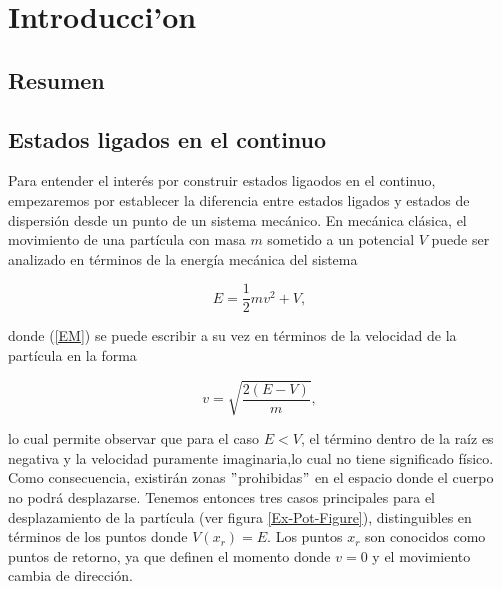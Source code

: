 
\chapter{Introducci'on}

\section{Resumen}

\section{Estados ligados en el continuo}

Para entender el interés por construir estados ligaodos en el continuo, empezaremos por establecer la diferencia entre estados ligados y estados de dispersión desde un punto de un sistema mecánico. En mecánica clásica, el movimiento de una partícula con masa $m$ sometido a un potencial $V$ puede ser analizado en términos de la energía mecánica del sistema

\begin{equation}
	E = \frac{1}{2} mv^2 + V, \label{EM}
\end{equation}

donde (\ref{EM})  se puede escribir a su vez en términos de la velocidad de la partícula en la forma

\begin{equation*}
v = \sqrt{\frac{2(E-V)}{m}},
\end{equation*}

lo cual permite observar que para el caso $E < V$, el término dentro de la raíz es negativa y la velocidad puramente imaginaria,lo cual no tiene significado físico. Como consecuencia, existirán zonas $"$prohibidas$"$ en el espacio donde el cuerpo no podrá desplazarse. Tenemos entonces tres casos principales para el desplazamiento de la partícula (ver figura \ref{Ex-Pot-Figure}), distinguibles en términos de los puntos donde $V(x_r) = E$. Los puntos $x_r$ son conocidos como puntos de retorno, ya que definen el momento donde $v=0$ y el movimiento cambia de dirección. 

